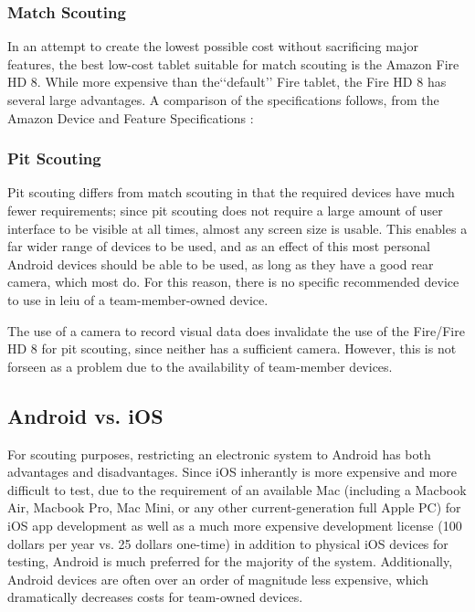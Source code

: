 \documentclass[11pt]{report}
\begin{document}
\subsubsection{Match Scouting}

In an attempt to create the lowest possible cost without sacrificing major features, the best low-cost tablet suitable for match scouting is the Amazon Fire HD 8. While more expensive than the\lq\lq{default}\rq\rq{} Fire tablet, the Fire HD 8 has several large advantages. A comparison of the specifications follows, from the Amazon Device and Feature Specifications \cite{amazondevicespec}:

\begin{center}


\end{center}

\subsubsection{Pit Scouting}

Pit scouting differs from match scouting in that the required devices have much fewer requirements; since pit scouting does not require a large amount of user interface to be visible at all times, almost any screen size is usable. This enables a far wider range of devices to be used, and as an effect of this most personal Android devices should be able to be used, as long as they have a good rear camera, which most do. For this reason, there is no specific recommended device to use in leiu of a team-member-owned device. \newline

The use of a camera to record visual data does invalidate the use of the Fire/Fire HD 8 for pit scouting, since neither has a sufficient camera. However, this is not forseen as a problem due to the availability of team-member devices.
 
\subsection{Android vs. iOS}

For scouting purposes, restricting an electronic system to Android has both advantages and disadvantages. Since iOS inherantly is more expensive and more difficult to test, due to the requirement of an available Mac (including a Macbook Air, Macbook Pro, Mac Mini, or any other current-generation full Apple PC) for iOS app development as well as a much more expensive development license (100 dollars per year vs. 25 dollars one-time) in addition to physical iOS devices for testing, Android is much preferred for the majority of the system. Additionally, Android devices are often over an order of magnitude less expensive, which dramatically decreases costs for team-owned devices. \newline
\end{document}
